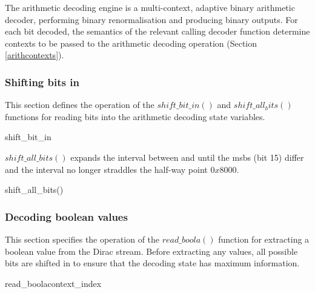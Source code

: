 The arithmetic decoding engine is a multi-context, adaptive binary
arithmetic decoder, performing binary renormalisation and producing
binary outputs. For each bit decoded, the semantics of the relevant
calling decoder function determine contexts to be passed to the
arithmetic decoding operation (Section \ref{arithcontexts}).

\subsubsection{Shifting bits in}

\label{arithshiftin}

This section defines the operation of the $shift\_bit\_in()$ 
and $shift\_all_bits()$ functions
for reading bits into the arithmetic decoding state variables.

\begin{pseudo}{shift\_bit\_in}{}
\end{pseudo}

$shift\_all\_bits()$ expands the interval between \ALow and \AHigh
until the msbs (bit 15) differ and the interval no longer
straddles the half-way point $0x8000$.

\begin{pseudo}{shift\_all\_bits()}{}
\bsEND
{}
\bsEND
\end{pseudo}

\subsubsection{Decoding boolean values}

\label{arithreadbool}

This section specifies the operation of the $read\_boola()$ function
for extracting a boolean value from the Dirac stream. Before extracting
any values, all possible bits are shifted in to ensure that the decoding
state has maximum information.

\begin{pseudo}{read\_boola}{context\_index}
\bsELSE
\bsEND
{}
\bsEND
{}
\end{pseudo}

